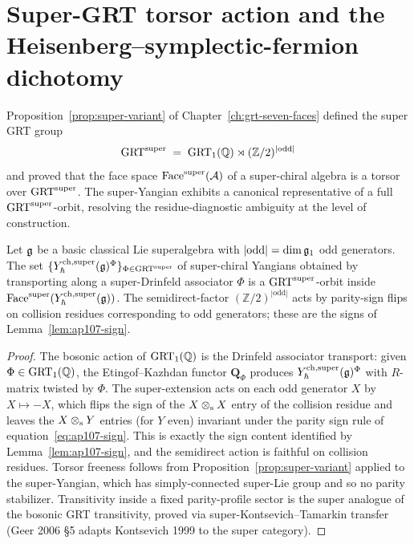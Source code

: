 \section{Super-GRT torsor action and the Heisenberg--symplectic-fermion dichotomy}
\label{sec:super-grt-torsor}

Proposition~\ref{prop:super-variant} of
Chapter~\ref{ch:grt-seven-faces} defined the super GRT group
\[
 \mathrm{GRT}^{\mathrm{super}} \;=\; \mathrm{GRT}_1(\mathbb{Q})\rtimes(\mathbb{Z}/2)^{|\mathrm{odd}|}
\]
and proved that the face space $\mathrm{Face}^{\mathrm{super}}(\mathcal{A})$ of a super-chiral algebra
is a torsor over $\mathrm{GRT}^{\mathrm{super}}$. The super-Yangian exhibits a
canonical representative of a full $\mathrm{GRT}^{\mathrm{super}}$-orbit, resolving the
residue-diagnostic ambiguity at
the level of construction.

\begin{proposition}
\label{prop:super-yangian-grt-orbit}
Let $\mathfrak{g}$ be a basic classical Lie superalgebra with
$|\mathrm{odd}|=\dim\mathfrak{g}_1$ odd generators. The set
$\{Y^{\mathrm{ch},\mathrm{super}}_{\hbar}(\mathfrak{g})^{\Phi}\}_{\Phi\in\mathrm{GRT}^{\mathrm{super}}}$ of super-chiral Yangians
obtained by transporting along a super-Drinfeld associator $\Phi$ is a
$\mathrm{GRT}^{\mathrm{super}}$-orbit inside $\mathrm{Face}^{\mathrm{super}}(Y^{\mathrm{ch},\mathrm{super}}_{\hbar}(\mathfrak{g}))$. The
semidirect-factor $(\mathbb{Z}/2)^{|\mathrm{odd}|}$ acts by parity-sign
flips on collision residues corresponding to odd generators; these are
the signs of Lemma~\ref{lem:ap107-sign}.
\end{proposition}

\begin{proof}
The bosonic action of $\mathrm{GRT}_1(\mathbb{Q})$ is the Drinfeld associator
transport: given $\Phi\in\mathrm{GRT}_1(\mathbb{Q})$, the Etingof--Kazhdan functor
$\mathbf{Q}_\Phi$ produces $Y^{\mathrm{ch},\mathrm{super}}_{\hbar}(\mathfrak{g})^\Phi$ with
$R$-matrix twisted by $\Phi$. The super-extension acts on each odd
generator $X$ by $X\mapsto -X$, which flips the sign of the
$X\mathbin{\otimes_{\mathrm{s}}} X$ entry of the collision residue and leaves the
$X\mathbin{\otimes_{\mathrm{s}}} Y$ entries (for $Y$ even) invariant under the parity
sign rule of equation~\eqref{eq:ap107-sign}. This is exactly the
sign content identified by Lemma~\ref{lem:ap107-sign}, and the
semidirect action is faithful on collision residues. Torsor freeness
follows from Proposition~\ref{prop:super-variant} applied to the
super-Yangian, which has simply-connected super-Lie group and so no
parity stabilizer. Transitivity inside a fixed parity-profile sector is
the super analogue of the bosonic GRT transitivity, proved via
super-Kontsevich--Tamarkin transfer
(Geer 2006 \S5 adapts Kontsevich 1999 to the super category).
\end{proof}

